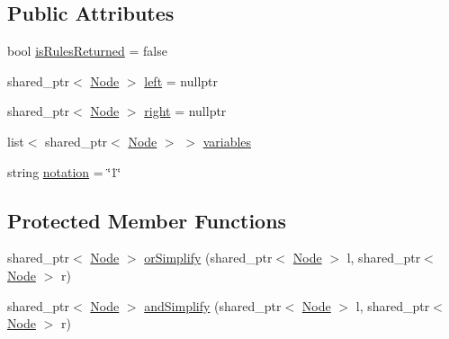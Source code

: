 \subsection*{Public Attributes}
\begin{DoxyCompactItemize}
\item 
bool \hyperlink{class_node_a9b7777ab2a657b4a901b3578bbf68831}{is\+Rules\+Returned} = false
\item 
shared\+\_\+ptr$<$ \hyperlink{class_node}{Node} $>$ \hyperlink{class_node_a978574f2c08939cfef1041041eb9c5be}{left} = nullptr
\item 
shared\+\_\+ptr$<$ \hyperlink{class_node}{Node} $>$ \hyperlink{class_node_af68a851484bce64ed9463a50025df424}{right} = nullptr
\item 
list$<$ shared\+\_\+ptr$<$ \hyperlink{class_node}{Node} $>$ $>$ \hyperlink{class_node_a350b631f3a9192bfa23bc266f6b8da02}{variables}
\item 
string \hyperlink{class_node_a0178acf2d687a5535122e4cdb1e8e079}{notation} = \char`\"{}1\char`\"{}
\end{DoxyCompactItemize}
\subsection*{Protected Member Functions}
\begin{DoxyCompactItemize}
\item 
shared\+\_\+ptr$<$ \hyperlink{class_node}{Node} $>$ \hyperlink{class_node_a92e887aab236cfc28d81bdf0fdb9379f}{or\+Simplify} (shared\+\_\+ptr$<$ \hyperlink{class_node}{Node} $>$ l, shared\+\_\+ptr$<$ \hyperlink{class_node}{Node} $>$ r)
\item 
shared\+\_\+ptr$<$ \hyperlink{class_node}{Node} $>$ \hyperlink{class_node_afd9769d942984448aa8e541ada73b289}{and\+Simplify} (shared\+\_\+ptr$<$ \hyperlink{class_node}{Node} $>$ l, shared\+\_\+ptr$<$ \hyperlink{class_node}{Node} $>$ r)
\end{DoxyCompactItemize}
